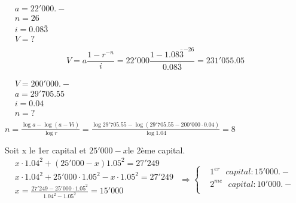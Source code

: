 \begin{solution}
$\begin{array}{ll}
  & a=22'000.- \\ 
 & n=26 \\ 
 & i=0.08\bar{3} \\ 
 & V=? \\ 
\end{array}$		
\[V=a\frac{1-{{r}^{-n}}}{i}=22'000\frac{1-1.08{{\overline{3}}^{-26}}}{0.08\overline{3}}=231'055.05\]
\end{solution}

\begin{solution}
$\begin{array}{ll}
  & V=200'000.- \\ 
 & a=29'705.55 \\ 
 & i=0.04 \\ 
 & n=? \\ 
\end{array}$
$n=\frac{\log a-\log \left( a-Vi \right)}{\log r}=\frac{\log 29'705.55-\log \left( 29'705.55-200'000\cdot 0.04 \right)}{\log 1.04}=8$
\end{solution}

\begin{solution}
Soit x le 1er capital et $25'000-x$le 2ème capital.
$\begin{array}{ll}
  & x\cdot {{1.04}^{2}}+\left( 25'000-x \right){{1.05}^{2}}=27'249 \\ 
 & x\cdot {{1.04}^{2}}+25'000\cdot {{1.05}^{2}}-x\cdot {{1.05}^{2}}=27'249 \\ 
 & x=\frac{27'249-25'000\cdot {{1.05}^{2}}}{{{1.04}^{2}}-{{1.05}^{2}}}=15'000 \\ 
\end{array}$		
$\Rightarrow \left\{ \begin{array}{ll}
  & {{1}^{er}}\text{ }capital:15'000.- \\ 
 & {{2}^{me}}\text{ }capital:10'000.- \\ 
\end{array} \right.$
\end{solution}

